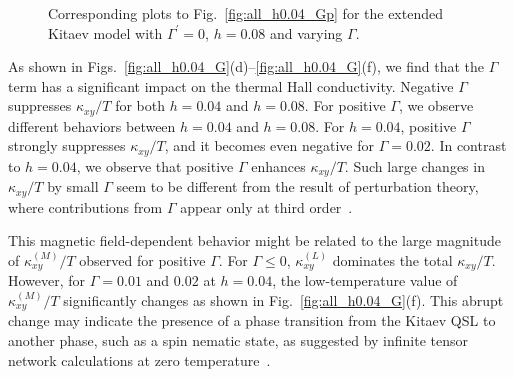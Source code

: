 \documentclass[twocolumn,superscriptaddress,showpacs, longbibliography, aps, prb]{revtex4-2}
\newcommand{\red}[1]{\textcolor{red}{#1}}
\newcommand{\blue}[1]{\textcolor{blue}{#1}}
\newcommand{\orange}[1]{\textcolor{orange}{#1}}
\begin{document}
\begin{figure}
\begin{center}
  \end{center}
  \caption{
   Corresponding plots to Fig.~\ref{fig:all_h0.04_Gp} for the extended Kitaev model with $\Gamma^{\prime}=0$, $h=0.08$ and varying $\Gamma$. 
  }
  \label{fig:all_h0.08_G}
\end{figure}

As shown in Figs.~\ref{fig:all_h0.04_G}(d)--\ref{fig:all_h0.04_G}(f), 
we find that the $\Gamma$ %
term %
has a significant impact on the thermal Hall conductivity. %
Negative $\Gamma$ suppresses $\kappa_{xy}/T$ for both %
$h = 0.04$ and $h=0.08$. 
For positive $\Gamma$, we %
observe different behaviors between $h = 0.04$ and $h=0.08$. For $h=0.04$, positive $\Gamma$ %
strongly suppresses $\kappa_{xy}/T$, and it becomes even negative for $\Gamma = 0.02$. In contrast to $h=0.04$, we %
observe that positive $\Gamma$ enhances $\kappa_{xy}/T$. Such %
large changes in $\kappa_{xy}/T$ by small $\Gamma$ seem to be different from the result of perturbation theory, %
where contributions from $\Gamma$ appear only at third order~\cite{YamadaF2021}. 

This magnetic field-dependent behavior might be related to the large magnitude of $\kappa_{xy}^{(M)}/T$ observed for positive $\Gamma$. For $\Gamma \le 0$, $\kappa_{xy}^{(L)}$ dominates the total $\kappa_{xy}/T$.
However, for $\Gamma = 0.01$ and $0.02$ at $h=0.04$, %
the low-temperature value of $\kappa_{xy}^{(M)}/T$ %
significantly changes as shown in Fig.~\ref{fig:all_h0.04_G}(f).%
This abrupt change may %
indicate the presence of a phase transition from the Kitaev QSL to another phase, such as a spin nematic state, %
as suggested by %
infinite tensor network calculations at zero temperature~\cite{Lee_NCom2020}.
   
\end{document}
